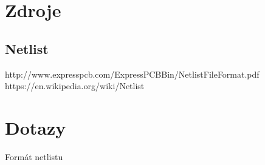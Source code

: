 \documentclass[11pt,a4paper]{article}
\author{Stanislav Nechutný}
\begin{document}
	\section{Zdroje}
	
		\subsection{Netlist}
			http://www.expresspcb.com/ExpressPCBBin/NetlistFileFormat.pdf
			https://en.wikipedia.org/wiki/Netlist

	\section{Dotazy}
		Formát netlistu
		
\end{document}
